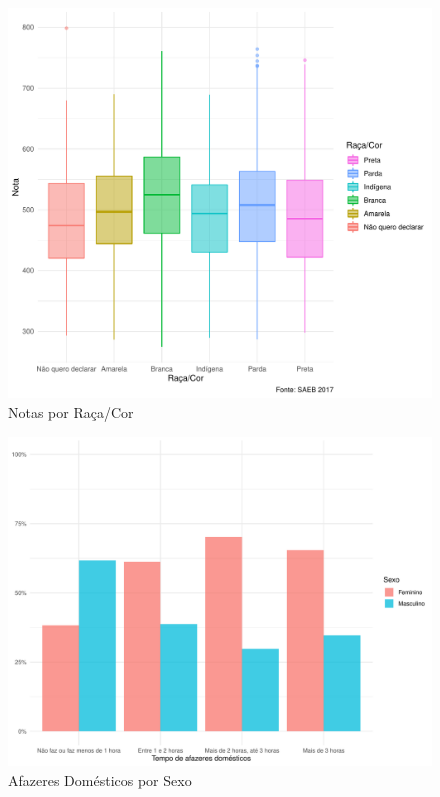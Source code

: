 \newpage
\begin{figure}[h]
    \caption{Notas por Raça/Cor}
    \includegraphics[width=18cm]{img/raca_cor_notas.pdf}
\end{figure}

\newpage

\begin{figure}[h]
    \caption{Afazeres Domésticos por Sexo}
    \includegraphics[width=18cm]{img/sexo_afazeres.pdf}
\end{figure}


